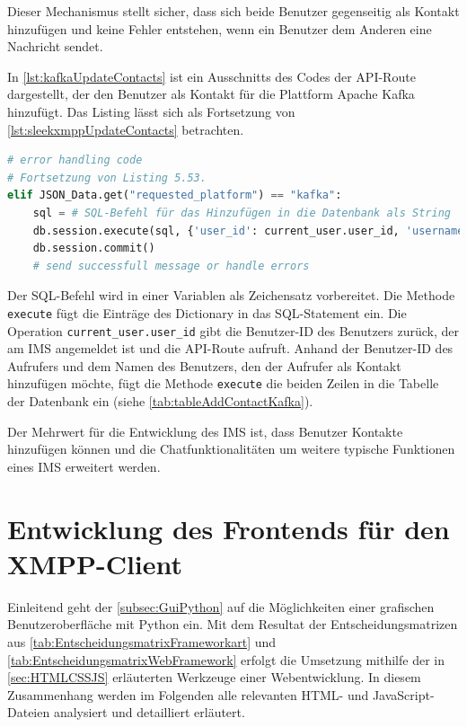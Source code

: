 \documentclass[a4paper,titlepage,halfparskip,12pt]{scrreprt}
\begin{document}
\begin{onehalfspacing}
Dieser Mechanismus stellt sicher, dass sich beide Benutzer gegenseitig als Kontakt hinzufügen und keine Fehler entstehen, wenn ein Benutzer dem Anderen eine Nachricht sendet.

In \autoref{lst:kafkaUpdateContacts} ist ein Ausschnitts des Codes der \acs{API}-Route dargestellt, der den Benutzer als Kontakt für die Plattform Apache Kafka hinzufügt. Das Listing lässt sich als Fortsetzung von \autoref{lst:sleekxmppUpdateContacts} betrachten.

\begin{lstlisting}[language=python, caption={Code für das Hinzufügen eines Kontakts der Plattform Kafka}, label={lst:kafkaUpdateContacts}]
# error handling code
# Fortsetzung von Listing 5.53.
elif JSON_Data.get("requested_platform") == "kafka":
    sql = # SQL-Befehl für das Hinzufügen in die Datenbank als String
    db.session.execute(sql, {'user_id': current_user.user_id, 'username': user_name})
    db.session.commit()
    # send successfull message or handle errors
\end{lstlisting}

Der SQL-Befehl wird in einer Variablen als Zeichensatz vorbereitet. Die Methode \texttt{execute} fügt die Einträge des Dictionary in das SQL-Statement ein. Die Operation \texttt{current\_user.user\_id} gibt die Benutzer-ID des Benutzers zurück, der am \acs{IMS} angemeldet ist und die \acs{API}-Route aufruft. Anhand der Benutzer-ID des Aufrufers und dem Namen des Benutzers, den der Aufrufer als Kontakt hinzufügen möchte, fügt die Methode \texttt{execute} die beiden Zeilen in die Tabelle der Datenbank ein (siehe \autoref{tab:tableAddContactKafka}).

Der Mehrwert für die Entwicklung des \acs{IMS} ist, dass Benutzer Kontakte hinzufügen können und die Chatfunktionalitäten um weitere typische Funktionen eines \acs{IMS} erweitert werden.

\pagebreak

\chapter{Entwicklung des Frontends für den XMPP-Client}
\label{sec:FrontendXMPP}
Einleitend geht der \autoref{subsec:GuiPython} auf die Möglichkeiten einer grafischen Benutzeroberfläche mit Python ein. Mit dem Resultat der Entscheidungsmatrizen aus \autoref{tab:EntscheidungsmatrixFrameworkart} und \autoref{tab:EntscheidungsmatrixWebFramework} erfolgt die Umsetzung mithilfe der in \autoref{sec:HTMLCSSJS} erläuterten Werkzeuge einer Webentwicklung. In diesem Zusammenhang werden im Folgenden alle relevanten HTML- und JavaScript-Dateien analysiert und detailliert erläutert. 


\end{onehalfspacing}
\end{document}
